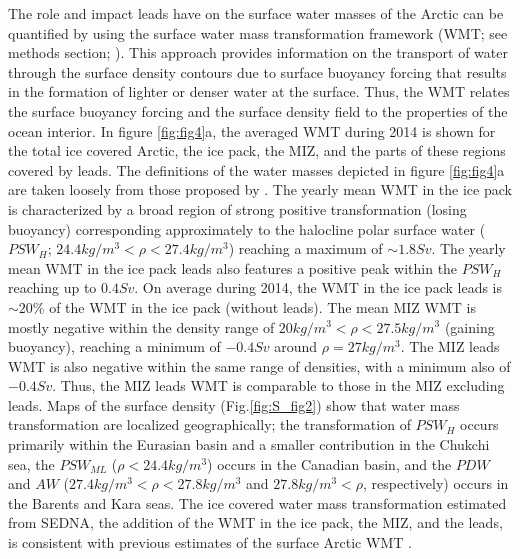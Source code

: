\documentclass[lineno,sn-basic]{sn-jnl}%
\begin{document}
The role and impact leads have on the surface water masses of the Arctic can be quantified by using the surface water mass transformation framework (WMT; see methods section; \citealp{Walin_WMT_1982}). This approach provides information on the transport of water through the surface density contours due to surface buoyancy forcing that results in the formation of lighter or denser water at the surface. Thus, the WMT relates the surface buoyancy forcing and the surface density field to the properties of the ocean interior. 
In figure \ref{fig:fig4}a, the averaged WMT during 2014 is shown for the total ice covered Arctic, the ice pack, the MIZ, and the parts of these regions covered by leads. The definitions of the water masses depicted in figure \ref{fig:fig4}a are taken loosely from those proposed by \citealt{Pemberton_WMT_2015, Lansard_water_mass_2012}.
The yearly mean WMT in the ice pack is characterized by a broad region of strong positive transformation (losing buoyancy) corresponding approximately to the halocline polar surface water ($PSW_{H}$; $24.4 kg/m^3 < \rho < 27.4 kg/m^3$) reaching a maximum of $\sim 1.8 Sv$.
The yearly mean WMT in the ice pack leads also features a positive peak within the $PSW_{H}$ reaching up to $0.4 Sv$. On average during 2014, the WMT in the ice pack leads is $\sim 20\%$ of the WMT in the ice pack (without leads). The mean MIZ WMT is mostly negative within the density range of $20 kg/m^3 < \rho < 27.5 kg/m^3$ (gaining buoyancy), reaching a minimum of $-0.4 Sv$ around $\rho = 27 kg/m^3$. The MIZ leads WMT is also negative within the same range of densities, with a minimum also of $-0.4 Sv$. Thus, the MIZ leads WMT is comparable to those in the MIZ excluding leads. Maps of the surface density (Fig.\ref{fig:S_fig2}) show that water mass transformation are localized geographically; the transformation of $PSW_{H}$ occurs primarily within the Eurasian basin and a smaller contribution in the Chukchi sea, the $PSW_{ML}$ ($\rho < 24.4 kg/m^3$) occurs in the Canadian basin, and the $PDW$ and $AW$ ($27.4 kg/m^3 < \rho < 27.8 kg/m^3$ and $27.8 kg/m^3 < \rho$, respectively) occurs in the Barents and Kara seas. The ice covered water mass transformation estimated from SEDNA, the addition of the WMT in the ice pack, the MIZ, and the leads, is consistent with previous estimates of the surface Arctic WMT \citep{Pemberton_WMT_2015}.
\end{document}
